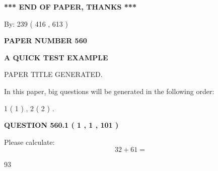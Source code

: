 \documentclass[12pt]{article}
\begin{document}
   
   
   
\vspace{1.0in} 
{\textbf{\large{ *** END OF PAPER, THANKS *** }}} 
   
   
\hspace{1.0in} By: 
 239 ( 416 ,  613 )
   
   
   
   
\newpage 
\setcounter{page}{ 
   560001 } 
   
   
   
   
 {\textbf{ \Large{ PAPER NUMBER  560  }}}
   
   
\vspace{0.2in}
   
   
   
   
   
   
   
   
 \vspace{0.2in}
{\LARGE {\textbf{ A QUICK TEST EXAMPLE}}}
   
   
 PAPER TITLE GENERATED.
   
   
   
\vspace{0.2in}
   
In this paper, big questions will be generated in the following order: 
   
   
   1 ( 1 )
 ,
   2 ( 2 )
 .
  
\vspace{0.2in}
  
{\textbf{\Large{QUESTION
560.1 
 ( 1 , 1 , 101 )
}}}
  
  
 
Please calculate:
\begin{equation}
32 +  %
61 = \nonumber
\end{equation}
 
 
 
\noindent{}
 
 

93
 
 
\noindent{}
 
 

 
 
 
\noindent{}
 
\end{document}
